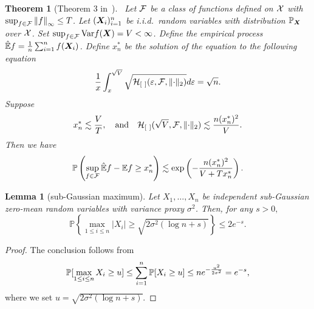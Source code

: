 \documentclass[11pt]{article}
\theoremstyle{plain}
\newtheorem{thm}{Theorem}[subsection]
\newtheorem{lem}{Lemma}
\theoremstyle{definition}
\newtheorem{rmk}{Remark}
\begin{document}
\begin{thm}[Theorem 3 in~\cite{shen1994convergence}]~\label{thm:refer}Let $\mathcal{F}$ be a class of functions defined on $\mathcal{X}$ with $\sup_{f\in\mathcal{F}}\left\lVert f\right\rVert_{\infty}\leq T$. Let $(\bm X_i)_{i=1}^n$ be i.i.d.\ random variables with distribution $\mathbb{P}_{\bm X}$ over $\mathcal{X}$. Set $\sup_{f\in\mathcal{F}}\textup{Var}f(\bm X)=V<\infty$. 
Define the empirical process $\mathbb{\hat E}f={1\over n}\sum_{i=1}^n f(\bm X_i)$. 
Define $x_n^*$ be the solution of the equation to the following equation
\[
{1\over x}\int_x^{\sqrt{V}}\sqrt{\mathcal{H}_{[\ ]}(\varepsilon,\mathcal{F},\lVert\cdot\rVert_2)}d\varepsilon =\sqrt{n}.
\]
Suppose
\[
x_n^*\lesssim {V\over T},\quad \text{and}\quad \mathcal{H}_{[\ ]}(\sqrt{V},\mathcal{F},\lVert\cdot\rVert_2)\lesssim {n(x_n^*)^2 \over V}.
\]
Then we have
\begin{equation}\label{eq:oneside}
\mathbb{P}\left(\sup_{f\in\tF}\mathbb{\hat E}f -\mathbb{E}f\geq x^*_n\right)\lesssim  \exp\left(-{n (x^*_n)^2\over V+Tx^*_n}\right). %
\end{equation}
\end{thm}

\begin{lem}[sub-Gaussian maximum]\label{lem:subg}
Let $X_1,\ldots,X_n$ be independent sub-Gaussian zero-mean random variables with variance proxy $\sigma^2$. Then, for any $s>0,$
\[\mathbb{P}\left\{\max_{1\leq i\leq n}|X_i|\geq\sqrt{2\sigma^2(\log n +s)}\right\}\leq2 e^{-s}.\]
\end{lem}
\begin{proof}
The conclusion follows from
\begin{align}
\mathbb{P}[\max_{1\leq i\leq n}X_i\geq u] \leq \sum_{i=1}^n\mathbb{P}[X_i\geq u]\leq n e^{-{u^2\over 2\sigma^2}} = e^{-s},
\end{align}
where we set $u = \sqrt{2\sigma^2(\log n+s)}.$
\end{proof}



     
\end{document}
